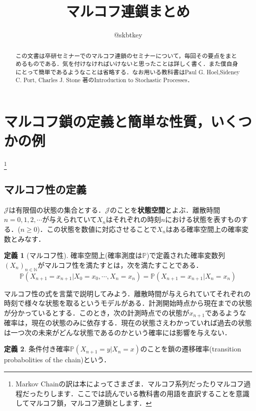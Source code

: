 \documentclass[12pt, a4paper]{jsarticle}
\title{マルコフ連鎖まとめ}
\author{@skbtkey}
\date{}
\theoremstyle{definition}
\newtheorem{defn}{定義}[section]
\newcommand{\NN}{{\mathbb{N}}} %
\begin{document}
\maketitle
\begin{abstract}
この文書は卒研セミナーでのマルコフ連鎖のセミナーについて，毎回その要点をまとめるものである．気を付けなければいけないと思ったことは詳しく書く．また僕自身にとって簡単であるようなことは省略する．なお用いる教科書はPaul G. Hoel,Sideney C. Port, Charles J. Stone 著のIntroduction to Stochastic Processes．
\end{abstract}

\section{マルコフ鎖の定義と簡単な性質，いくつかの例}\footnote{Markov Chainの訳は本によってさまざま．マルコフ系列だったりマルコフ過程だったりします．ここでは読んでいる教科書の用語を直訳することを意識してマルコフ鎖，マルコフ連鎖とします．}

\subsection{マルコフ性の定義}
$\mathcal{J}$は有限個の状態の集合とする．$\mathcal{J}$のことを{\bf 状態空間}とよぶ．離散時間$n = 0,1,2,\cdots$が与えられていて$X_n$はそれぞれの時刻$n$における状態を表すものする．($n \ge 0$)．この状態を数値に対応させることで$X_n$はある確率空間上の確率変数とみなす．
\begin{screen}
	\begin{defn}[マルコフ性]
		確率空間上(確率測度は$\mathbb{P}$)で定義された確率変数列$(X_n)_{n \in \NN}$がマルコフ性を満たすとは，次を満たすことである．
\begin{equation}
\mathbb{P}(X_{n+1} = x_{n+1} | X_0 = x_0 , \cdots , X_n = x_n) = \mathbb{P}(X_{n+1} = x_{n+1} | X_n = x_n) \label{markov property}
\end{equation}
	\end{defn}
\end{screen}

マルコフ性の式を言葉で説明してみよう．離散時間が与えられていてそれぞれの時刻で様々な状態を取るというモデルがある．計測開始時点から現在までの状態が分かっているとする．このとき，次の計測時点での状態が$x_{n+1}$であるような確率は，現在の状態のみに依存する．現在の状態さえわかっていれば過去の状態は一つ次の未来がどんな状態であるのかという確率には影響を与えない．

\begin{screen}
	\begin{defn}
		条件付き確率$\mathbb{P}(X_{n+1} = y | X_n = x)$のことを鎖の遷移確率(transition probabolities of the chain)という．
	\end{defn}
\end{screen}
\end{document}
